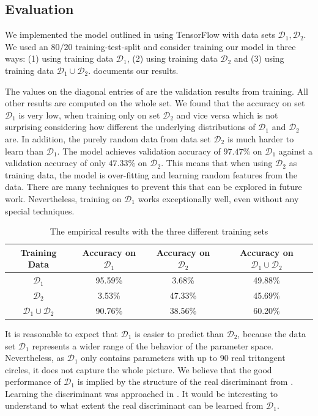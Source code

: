 \documentclass[12pt]{amsart}
\theoremstyle{definition}
\theoremstyle{definition}
\numberwithin{equation}{section}
\begin{document}
\subsection{Evaluation} \label{sec:evaluation}

We implemented the model outlined in  using TensorFlow \cite{tensorflow2015-whitepaper} with data sets $\mathcal{D}_1, \mathcal{D}_2$. We used an $80/20$ training-test-split and consider training our model in three ways: (1) using training data $\mathcal{D}_1$, (2) using training data $\mathcal{D}_2$ and (3) using training data $\mathcal{D}_1 \cup \mathcal{D}_2$.  documents our results.

The values on the diagonal entries of  are the validation results from training. All other results are computed on the whole set. We found that the accuracy on set $\mathcal{D}_1$ is very low, when training only on set $\mathcal{D}_2$ and vice versa which is not surprising considering how different the underlying distributions of $\mathcal{D}_1$ and $\mathcal{D}_2$ are. In addition, the purely random data from data set $\mathcal{D}_2$ is much harder to learn than $\mathcal{D}_1$.  
The model achieves validation accuracy of $97.47\%$ on $\mathcal{D}_1$ against a validation accuracy of only $47.33\%$ on $\mathcal D_2$. This means that when using $\mathcal{D}_2$ as training data, the model is over-fitting and learning random features from the data. There are many techniques to prevent this \cite{Goodfellow-et-al-2016} that can be explored in future work. Nevertheless, training on $\mathcal D_1$ works exceptionally well, even without any special techniques. 

\begin{table}
\begin{tabular}{|c|c|c|c|}
\hline 
    Training Data & Accuracy on $\mathcal{D}_1$ & Accuracy on $\mathcal{D}_2$ & Accuracy on $\mathcal{D}_1 \cup \mathcal{D}_2$\\\hline
    $\mathcal{D}_1$ & 95.59\% & 3.68\% & 49.88\%\\
    $\mathcal{D}_2$ & 3.53\% & 47.33\% & 45.69\%\\
    $\mathcal{D}_1 \cup \mathcal{D}_2$ & 90.76\% & 38.56\% & 60.20\% \\ \hline
\end{tabular}
\caption{The empirical results with the three different training sets} \label{tab:ml_eval}
\end{table}

It is reasonable to expect that $\mathcal D_1$ is easier to predict than $\mathcal D_2$, because the data set $\mathcal D_1$ represents a wider range of the behavior of the parameter space. Nevertheless, as $\mathcal D_1$ only contains parameters with up to 90 real tritangent circles, it does not capture the whole picture. We believe that the good performance of $\mathcal D_1$ is implied by the structure of the real discriminant from . Learning the discriminant was approached in \cite{Bernal2020MachineLT}. It would be interesting to understand to what extent the real discriminant can be learned from $\mathcal D_1$. 




\end{document}
